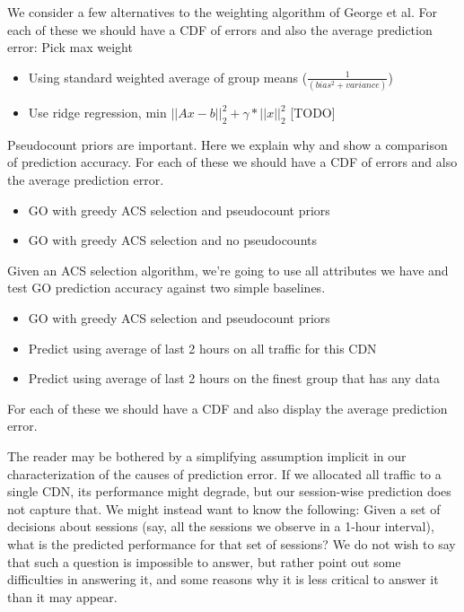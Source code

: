 
We consider a few alternatives to the weighting algorithm of George et al.  For each of these we should have a CDF of errors and also the average prediction error:
Pick max weight
\begin{itemize}
	\item Using standard weighted average of group means ($\frac{1}{(bias^2 + variance)}$)
	\item Use ridge regression, min $||Ax - b||_2^2 + \gamma*||x||_2^2$ [TODO]
\end{itemize}


Pseudocount priors are important.  Here we explain why and show a comparison of prediction accuracy.  For each of these we should have a CDF of errors and also the average prediction error.
\begin{itemize}
	\item GO with greedy ACS selection and pseudocount priors
	\item GO with greedy ACS selection and no pseudocounts
\end{itemize}

Given an ACS selection algorithm, we’re going to use all attributes we have and test GO prediction accuracy against two simple baselines.
\begin{itemize}
	\item GO with greedy ACS selection and pseudocount priors
	\item Predict using average of last 2 hours on all traffic for this CDN
	\item Predict using average of last 2 hours on the finest group that has any data
\end{itemize}
For each of these we should have a CDF and also display the average prediction error.


The reader may be bothered by a simplifying assumption implicit in our characterization of the causes of prediction error.  If we allocated all traffic to a single CDN, its performance might degrade, but our session-wise prediction does not capture that.  We might instead want to know the following: Given a set of decisions about sessions (say, all the sessions we observe in a 1-hour interval), what is the predicted performance for that set of sessions?  We do not wish to say that such a question is impossible to answer, but rather point out some difficulties in answering it, and some reasons why it is less critical to answer it than it may appear.

